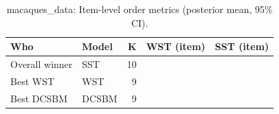 \begin{table}[!h]
\centering
\caption{macaques_data: Item-level order metrics (posterior mean, 95\% CI).\\\label{tab:app-macaques_data-best-item-families}}
\centering
\begin{tabular}[t]{llrrr}
\toprule
Who & Model & K & WST (item) & SST (item)\\
\midrule
Overall winner & SST & 10 &  & \\
Best WST & WST & 9 &  & \\
Best DCSBM & DCSBM & 9 &  & \\
\bottomrule
\end{tabular}
\end{table}
